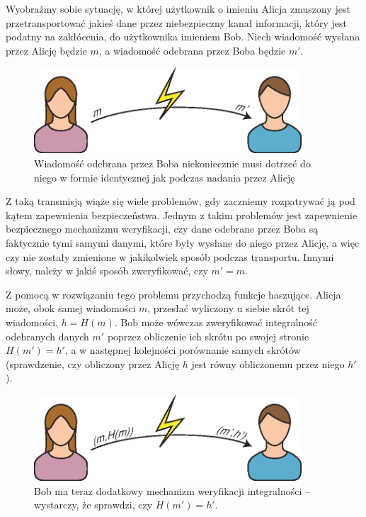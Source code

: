 \documentclass[12pt,a4paper,twoside]{article}
\begin{document}
Wyobraźmy sobie sytuację, w której użytkownik o imieniu Alicja zmuszony jest
przetransportować jakieś dane przez niebezpieczny kanał informacji, który jest
podatny na zakłócenia, do użytkownika imieniem Bob. Niech wiadomość wysłana
przez Alicję będzie $m$, a wiadomość odebrana przez Boba będzie $m'$.

\begin{figure}[htb!]
\includegraphics[width=10cm]{img/usage1.eps}
\caption{Wiadomość odebrana przez Boba niekoniecznie musi dotrzeć do niego w
formie identycznej jak podczas nadania przez Alicję}
\label{fig:usage_integrity_check_1}
\end{figure}

Z taką transmisją wiąże się wiele problemów, gdy zaczniemy rozpatrywać ją pod
kątem zapewnienia bezpieczeństwa. Jednym z takim problemów jest zapewnienie
bezpiecznego mechanizmu weryfikacji, czy dane odebrane przez Boba są faktycznie
tymi samymi danymi, które były wysłane do niego przez Alicję, a więc czy nie
zostały zmienione w jakikolwiek sposób podczas transportu. Innymi słowy, należy
w jakiś sposób zweryfikować, czy $m' = m$.

Z pomocą w rozwiązaniu tego problemu przychodzą funkcje haszujące. Alicja może,
obok samej wiadomości $m$, przesłać wyliczony u siebie skrót tej wiadomości,
$h=H(m)$. Bob może wówczas zweryfikować integralność odebranych danych $m'$
poprzez obliczenie ich skrótu po swojej stronie $H(m')=h'$, a w następnej
kolejności porównanie samych skrótów (sprawdzenie, czy obliczony przez Alicję
$h$ jest równy obliczonemu przez niego $h'$).

\begin{figure}[htb!]
\includegraphics[width=10cm]{img/usage1b.eps}
\caption{Bob ma teraz dodatkowy mechanizm weryfikacji integralności --
wystarczy, że sprawdzi, czy $H(m')=h'$.}
\label{fig:usage_integrity_check_2}
\end{figure}
\end{document}
